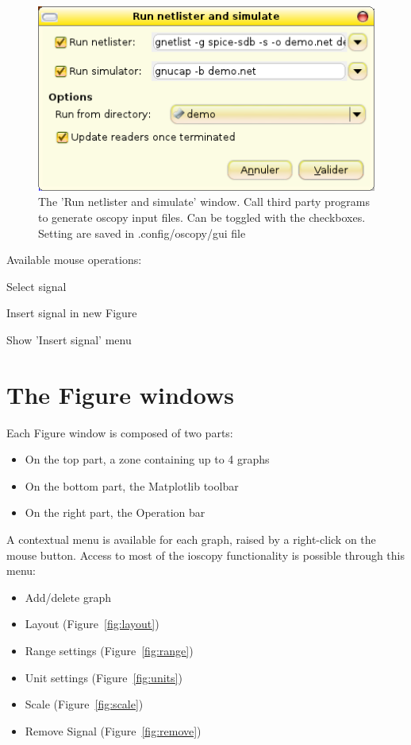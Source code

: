 \documentclass[a4paper,11pt]{report}
\renewenvironment{description}{%
\begin{basedescript}{%
\renewcommand{\makelabel}[1]{\bfseries##1}%
}%
}{%
\end{basedescript}%
}
\begin{document}
\begin{figure}[htbp]
  \includegraphics[scale=.5]{../png/ioscopy-netnsim.png}
  \caption{The 'Run netlister and simulate' window. Call third party programs to generate oscopy input files. Can be toggled with the checkboxes. Setting are saved in .config/oscopy/gui file}
  \label{fig:netnsim}

\end{figure}

\noindent Available mouse operations:
\begin{description}
\item[left] Select signal
\item[double left] Insert signal in new Figure
\item[right] Show 'Insert signal' menu
\end{description}

\section{The Figure windows}

Each Figure window is composed of two parts:
\begin{itemize}
\item On the top part, a zone containing up to 4 graphs
\item On the bottom part, the Matplotlib toolbar
\item On the right part, the Operation bar
\end{itemize}
A contextual menu is available for each graph, raised by a right-click on the mouse button.
Access to most of the ioscopy functionality is possible through this menu:
\begin{itemize}
\item Add/delete graph
\item Layout (Figure~\ref{fig:layout})
\item Range settings (Figure~\ref{fig:range})
\item Unit settings (Figure~\ref{fig:units})
\item Scale (Figure~\ref{fig:scale})
\item Remove Signal (Figure~\ref{fig:remove})
\end{itemize}
\end{document}
